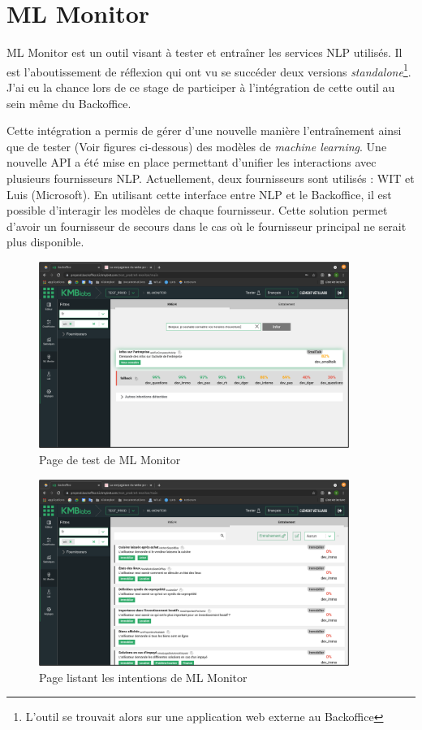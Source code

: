 \documentclass[12pt,a4paper,oneside]{scrreprt}
\begin{document}
\section{ML Monitor}

ML Monitor est un outil visant à tester et entraîner les services NLP utilisés. Il est l'aboutissement de réflexion qui ont vu se succéder deux versions \textit{standalone}\footnote{L'outil se trouvait alors sur une application web externe au Backoffice}. J'ai eu la chance lors de ce stage de participer à l'intégration de cette outil au sein même du Backoffice.

Cette intégration a permis de gérer d'une nouvelle manière l'entraînement ainsi que de tester (Voir figures ci-dessous) des modèles de \textit{machine learning}. Une nouvelle API a été mise en place permettant d'unifier les interactions avec plusieurs fournisseurs NLP. Actuellement, deux fournisseurs sont utilisés : WIT et Luis (Microsoft). En utilisant cette interface entre NLP et le Backoffice, il est possible d'interagir les modèles de chaque fournisseur. Cette solution permet d'avoir un fournisseur de secours dans le cas où le fournisseur principal ne serait plus disponible.

\begin{figure}
	\centering
	\includegraphics[width=0.9\textwidth]{pictures/mlmonitor_test.png}
	\caption{Page de test de ML Monitor}
	\label{fig:mlmonitor_test}
\end{figure}

\begin{figure}
	\centering
	\includegraphics[width=0.9\textwidth]{pictures/mlmonitor_intentions.png}
	\caption{Page listant les intentions de ML Monitor}
	\label{fig:mlmonitor_intentions}
\end{figure}
\end{document}
